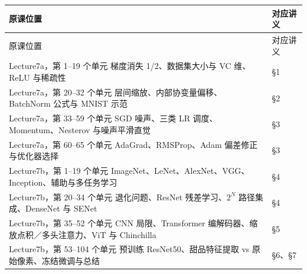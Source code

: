 \begingroup\small\setlength{\tabcolsep}{3pt}\renewcommand{\arraystretch}{1.22}
\begin{longtable}{@{}>{\raggedright\arraybackslash}p{}>{\raggedright\arraybackslash}p{}@{}}
\toprule
原课位置 & 对应讲义 \\
\midrule\endfirsthead
原课位置 & 对应讲义 \\
\midrule\endhead
\bottomrule\endfoot
Lecture7a，第 1–19 个单元 梯度消失 1/2、数据集大小与 VC 维、ReLU 与稀疏性 & §1 \\
Lecture7a，第 20–32 个单元 层间缩放、内部协变量偏移、BatchNorm 公式与 MNIST 示范 & §2 \\
Lecture7a，第 33–59 个单元 SGD 噪声、三类 LR 调度、Momentum、Nesterov 与噪声平滑直觉 & §3 \\
Lecture7a，第 60–65 个单元 AdaGrad、RMSProp、Adam 偏差修正与优化器选择 & §3 \\
Lecture7b，第 1–19 个单元 ImageNet、LeNet、AlexNet、VGG、Inception、辅助与多任务学习 & §4 \\
Lecture7b，第 20–34 个单元 退化问题、ResNet 残差学习、$2^N$ 路径集成、DenseNet 与 SENet & §4 \\
Lecture7b，第 35–52 个单元 CNN 局限、Transformer 编解码器、缩放点积／多头注意力、ViT 与 Chinchilla & §5 \\
Lecture7b，第 53–104 个单元 预训练 ResNet50、甜品特征提取 vs 原始像素、冻结微调与总结 & §6、§7 \\
\end{longtable}\endgroup
